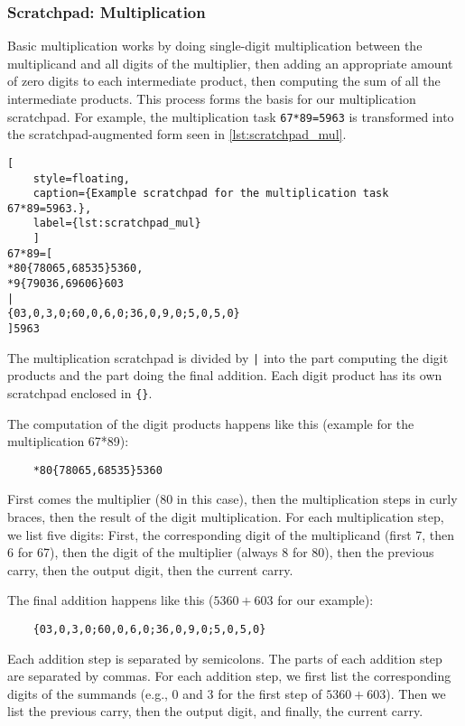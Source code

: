 \FloatBarrier
\subsubsection{Scratchpad: Multiplication}
\label{mul_scratchpad}

Basic multiplication works by doing single-digit multiplication between the multiplicand and all digits of the multiplier, then adding an appropriate amount of zero digits to each intermediate product, then computing the sum of all the intermediate products. This process forms the basis for our multiplication scratchpad. For example, the multiplication task \verb!67*89=5963!
is transformed into the scratchpad-augmented form seen in \cref{lst:scratchpad_mul}.

\begin{lstlisting}[
	style=floating,
	caption={Example scratchpad for the multiplication task 67*89=5963.},
	label={lst:scratchpad_mul}
	]
67*89=[
*80{78065,68535}5360,
*9{79036,69606}603
|
{03,0,3,0;60,0,6,0;36,0,9,0;5,0,5,0}
]5963
\end{lstlisting}

\noindent
The multiplication scratchpad is divided by \verb!|! into the part computing the digit products and the part doing the final addition.
Each digit product has its own scratchpad enclosed in \verb!{}!.

The computation of the digit products happens like this (example for the multiplication 67*89):

\begin{lstlisting}
	*80{78065,68535}5360
\end{lstlisting}

First comes the multiplier (80 in this case), then the multiplication steps in curly braces, then the result of the digit multiplication.
For each multiplication step, we list five digits: First, the corresponding digit of the multiplicand (first 7, then 6 for 67), then the digit of the multiplier (always 8 for 80), then the previous carry, then the output digit, then the current carry.

The final addition happens like this ($5360+603$ for our example):

\begin{lstlisting}
	{03,0,3,0;60,0,6,0;36,0,9,0;5,0,5,0}
\end{lstlisting}

Each addition step is separated by semicolons. The parts of each addition step are separated by commas. For each addition step, we first list the corresponding digits of the summands (e.g., 0 and 3 for the first step of $5360+603$). Then we list the previous carry, then the output digit, and finally, the current carry.

